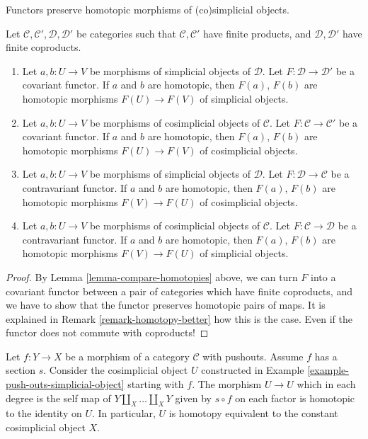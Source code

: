 \begin{lemma}
\label{lemma-functorial-homotopy}
\begin{slogan}
Functors preserve homotopic morphisms of (co)simplicial objects.
\end{slogan}
Let $\mathcal{C}, \mathcal{C}', \mathcal{D}, \mathcal{D}'$
be categories such that $\mathcal{C}, \mathcal{C}'$ have
finite products, and $\mathcal{D}, \mathcal{D}'$ have
finite coproducts.
\begin{enumerate}
\item Let $a, b : U \to V$ be morphisms of simplicial objects
of $\mathcal{D}$. Let $F : \mathcal{D} \to \mathcal{D}'$ be a covariant
functor. If $a$ and $b$ are homotopic, then $F(a)$, $F(b)$
are homotopic morphisms $F(U) \to F(V)$ of simplicial objects.
\item Let $a, b : U \to V$ be morphisms of cosimplicial objects
of $\mathcal{C}$. Let $F : \mathcal{C} \to \mathcal{C}'$ be a covariant
functor. If $a$ and $b$ are homotopic, then $F(a)$, $F(b)$
are homotopic morphisms $F(U) \to F(V)$ of cosimplicial objects.
\item Let $a, b : U \to V$ be morphisms of simplicial objects of $\mathcal{D}$.
Let $F : \mathcal{D} \to \mathcal{C}$ be a contravariant
functor. If $a$ and $b$ are homotopic, then $F(a)$, $F(b)$
are homotopic morphisms $F(V) \to F(U)$ of cosimplicial objects.
\item Let $a, b : U \to V$ be morphisms of cosimplicial objects of
$\mathcal{C}$.
Let $F : \mathcal{C} \to \mathcal{D}$ be a contravariant
functor. If $a$ and $b$ are homotopic, then $F(a)$, $F(b)$
are homotopic morphisms $F(V) \to F(U)$ of simplicial objects.
\end{enumerate}
\end{lemma}

\begin{proof}
By Lemma \ref{lemma-compare-homotopies} above, we can
turn $F$ into a covariant functor between a pair of
categories which have finite coproducts, and we have
to show that the functor preserves homotopic pairs
of maps. It is explained in Remark \ref{remark-homotopy-better} how this
is the case. Even if the functor does not commute with
coproducts!
\end{proof}

\begin{lemma}
\label{lemma-push-outs-simplicial-object-w-section}
Let $f : Y \to X$ be a morphism of a category $\mathcal{C}$ with
pushouts. Assume $f$ has a section $s$. Consider the
cosimplicial object $U$ constructed in
Example \ref{example-push-outs-simplicial-object}
starting with $f$. The morphism $U \to U$ which in each degree
is the self map of $Y \amalg_X \ldots \amalg_X Y$
given by $s \circ f$ on each factor is homotopic to the identity on $U$.
In particular, $U$ is homotopy equivalent to the constant
cosimplicial object $X$.
\end{lemma}

